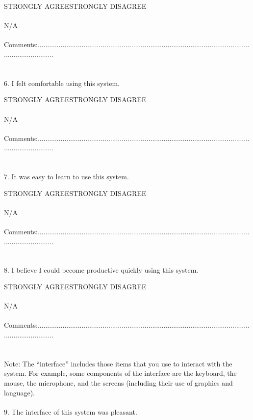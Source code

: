 \begin{appendix}
{STRONGLY AGREE\tab\tab\tab\tab\tab STRONGLY DISAGREE\\
\\
\tab\tab N/A\\
\\
Comments:.........................................................................................................................................\\
\\
\\
6. I felt comfortable using this system.

STRONGLY AGREE\tab\tab\tab\tab\tab STRONGLY DISAGREE\\
\\
\tab\tab N/A\\
\\
Comments:.........................................................................................................................................\\
\\
\\
7. It was easy to learn to use this system.

STRONGLY AGREE\tab\tab\tab\tab\tab STRONGLY DISAGREE\\
\\
\tab\tab N/A\\
\\
Comments:.........................................................................................................................................\\
\\
\\
8. I believe I could become productive quickly using this system.

STRONGLY AGREE\tab\tab\tab\tab\tab STRONGLY DISAGREE\\
\\
\tab\tab N/A\\
\\
Comments:.........................................................................................................................................\\
\\
\\
Note: The “interface” includes those items that you use to interact with the system. For example, some components of the interface are the keyboard, the mouse, the microphone, and the screens (including their use of graphics and language).\\
\\
9. The interface of this system was pleasant.

}
\end{appendix}
